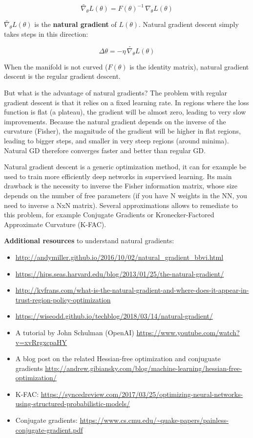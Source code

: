 \documentclass[
  letterpaper,
  DIV=11,
  numbers=noendperiod]{scrreprt}
\providecommand{\tightlist}{%
  \setlength{\itemsep}{0pt}\setlength{\parskip}{0pt}}\usepackage{longtable,booktabs,array}
\begin{document}
\[
    \tilde{\nabla_\theta} L(\theta) = F(\theta)^{-1} \, \nabla_\theta L(\theta)
\]

\(\tilde{\nabla_\theta} L(\theta)\) is the \textbf{natural gradient} of
\(L(\theta)\). Natural gradient descent simply takes steps in this
direction:

\[
    \Delta \theta = - \eta \, \tilde{\nabla_\theta} L(\theta)
\]

When the manifold is not curved (\(F(\theta)\) is the identity matrix),
natural gradient descent is the regular gradient descent.

But what is the advantage of natural gradients? The problem with regular
gradient descent is that it relies on a fixed learning rate. In regions
where the loss function is flat (a plateau), the gradient will be almost
zero, leading to very slow improvements. Because the natural gradient
depends on the inverse of the curvature (Fisher), the magnitude of the
gradient will be higher in flat regions, leading to bigger steps, and
smaller in very steep regions (around minima). Natural GD therefore
converges faster and better than regular GD.

Natural gradient descent is a generic optimization method, it can for
example be used to train more efficiently deep networks in supervised
learning. Its main drawback is the necessity to inverse the Fisher
information matrix, whose size depends on the number of free parameters
(if you have N weights in the NN, you need to inverse a NxN matrix).
Several approximations allows to remediate to this problem, for example
Conjugate Gradients or Kronecker-Factored Approximate Curvature (K-FAC).

\textbf{Additional resources} to understand natural gradients:

\begin{itemize}
\tightlist
\item
  \url{http://andymiller.github.io/2016/10/02/natural_gradient_bbvi.html}
\item
  \url{https://hips.seas.harvard.edu/blog/2013/01/25/the-natural-gradient/}
\item
  \url{http://kvfrans.com/what-is-the-natural-gradient-and-where-does-it-appear-in-trust-region-policy-optimization}
\item
  \url{https://wiseodd.github.io/techblog/2018/03/14/natural-gradient/}
\item
  A tutorial by John Schulman (OpenAI)
  \url{https://www.youtube.com/watch?v=xvRrgxcpaHY}
\item
  A blog post on the related Hessian-free optimization and conjuguate
  gradients
  \url{http://andrew.gibiansky.com/blog/machine-learning/hessian-free-optimization/}
\item
  K-FAC:
  \url{https://syncedreview.com/2017/03/25/optimizing-neural-networks-using-structured-probabilistic-models/}
\item
  Conjugate gradients:
  \url{https://www.cs.cmu.edu/~quake-papers/painless-conjugate-gradient.pdf}
\end{itemize}
\end{document}
